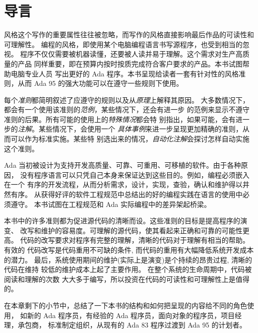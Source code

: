 %
%
%

\chapter{导言}
\label{c:introduction}
\pagestyle{fancy}

风格这个写作的重要属性往往被忽略，而写作的风格直接影响最后作品的可读性和
可理解性。 编程的风格，即使用某个电脑编程语言书写源程序，也受到相当的忽视。
程序不仅仅需要被机器读懂，还要被人读并易于理解。这个需求对生产高质量的产品
同样重要，即在预算内按时按质完成符合客户要求的产品。本书试图帮助电脑专业人员
写出更好的 Ada 程序。本书呈现给读者一套有针对性的风格准则，从而 Ada 95 
\cite{arm95}的强大功能可以在遵守一些规则下使用。

每个\emph{准则}都简明叙述了应遵守的规则以及从\emph{原理}上解释其原因。
大多数情况下，都会有一个使用该准则的\emph{范例}，某些情况下，还会有进一步
的范例来显示不遵守准则的后果。所有可能的使用上的\emph{特殊情况}都会特
别指出，如果可能，会有进一步的\emph{注解}。某些情况下，会使用一个
\emph{具体事例}来进一步呈现更加精确的准则，从而可以作为标准实施。某些特
别选出来的情况，\emph{自动化注解}会探讨怎样自动实施这个准则。

Ada 当初被设计为支持开发高质量、可靠、可重用、可移植的软件。由于各种原因，
没有程序语言可以只凭自己本身来保证达到这些目的。例如，编程必须嵌入在一个
有序的开发流程，从而分析需求，设计，实现，查验，确认和维护得以井然有序。
从获得好评的软件工程规范中总结出的好的编程实践在语言的使用中必须遵守。
本书试图在工程规范和 Ada 实际编程中的差异架起桥梁。

本书中的许多准则都为促进源代码的清晰而设。这些准则的目标是提高程序的演变、
改写和维护的容易度。可理解的源代码，使其看起来正确和可靠的可能性更高。
代码的改写要求对程序有完整的理解，清晰的代码对于理解有相当的帮助。有效的
代码改写是代码重用不可缺的条件, 而代码的重用有大幅降低系统开发成本的潜力。
最后，系统使用期间的维护(实际上是演变)是个持续的昂贵过程, 清晰的代码在维持
较低的维护成本上起了主要作用。 在整个系统的生命周期中，代码被阅读和理解的次数
大大多于编写，所以投资在代码的可读性和可理解性上是值得的。

在本章剩下的小节中，总结了一下本书的结构和如何把呈现的内容给不同的角色使用，
如新的 Ada 程序员，有经验的 Ada 程序员，面向对象的程序员，项目经理，承包商，
标准制定组织，从现有的 Ada 83\cite{arm83} 程序过渡到 Ada 95 的计划者。
 
